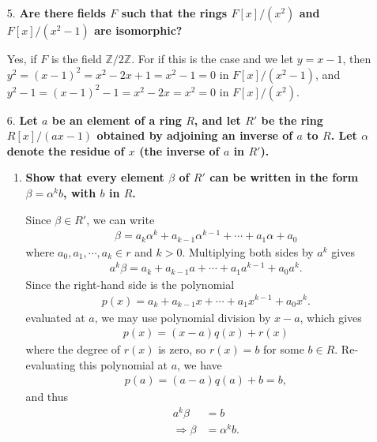 \documentclass[a4paper,12pt]{article}
\begin{document}
\begin{enumerate}
    \item[5.]
        \boldmath
        \textbf{Are there fields $F$ such that the rings $F[x]/(x^2)$ and $F[x]/(x^2 - 1)$ are isomorphic?} \par
        \unboldmath
        Yes, if $F$ is the field $\mathbb{Z}/2\mathbb{Z}$. For if this is the case and we let $y = x - 1$, then $y^2 = (x - 1)^2 = x^2 - 2x + 1 = x^2 - 1 = 0$ in $F[x]/(x^2 - 1)$, and $y^2 - 1 = (x - 1)^2 - 1 = x^2 - 2x = x^2 = 0$ in $F[x]/(x^2)$.

    \item[6.]
        \boldmath
        \textbf{Let $a$ be an element of a ring $R$, and let $R'$ be the ring $R[x]/(ax - 1)$ obtained by adjoining an inverse of $a$ to $R$. Let $\alpha$ denote the residue of $x$ (the inverse of $a$ in $R'$).} \par
        \unboldmath
        \begin{enumerate}
            \item
                \boldmath
                \textbf{Show that every element $\beta$ of $R'$ can be written in the form $\beta = \alpha^k b$, with $b$ in $R$.} \par
                \unboldmath
                Since $\beta \in R'$, we can write
                \begin{align*}
                    \beta = a_k \alpha^k + a_{k - 1} \alpha^{k - 1} + \cdots + a_1 \alpha + a_0
                \end{align*}
                where $a_0, a_1, \cdots, a_k \in r$ and $k > 0$. Multiplying both sides by $a^k$ gives
                \begin{align*}
                    a^k \beta = a_k + a_{k - 1} a + \cdots + a_1 a^{k - 1} + a_0 a^k.
                \end{align*}
                Since the right-hand side is the polynomial
                \begin{align*}
                    p(x) = a_k + a_{k - 1} x + \cdots + a_1 x^{k - 1} + a_0 x^k.
                \end{align*}
                evaluated at $a$, we may use polynomial division by $x - a$, which gives
                \begin{align*}
                    p(x) = (x - a) q(x) + r(x)
                \end{align*}
                where the degree of $r(x)$ is zero, so $r(x) = b$ for some $b \in R$. Re-evaluating this polynomial at $a$, we have
                \begin{align*}
                    p(a) = (a - a) q(a) + b = b,
                \end{align*}
                and thus
                \begin{align*}
                    a^k \beta &= b \\
                    \Rightarrow \beta &= \alpha^k b.
                \end{align*}


\end{enumerate}
\end{enumerate}
\end{document}
